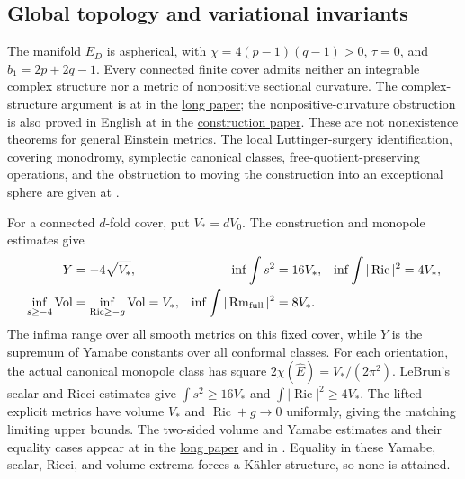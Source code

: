 \documentclass[a4paper,11pt]{article}
\numberwithin{equation}{section}
\theoremstyle{definition}
\newcommand{\Ric}{\operatorname{Ric}}
\newcommand{\Rm}{\operatorname{Rm}}
\newcommand{\Vol}{\operatorname{Vol}}
\begin{document}
\subsection{Global topology and variational invariants}\label{sec:bundle-values}
The manifold $E_D$ is aspherical, with $\chi=4(p-1)(q-1)>0$, $\tau=0$, and $b_1=2p+2q-1$.
Every connected finite cover admits neither an integrable complex structure nor a metric of nonpositive sectional curvature. The complex-structure argument is at  in the \href{20260912.tex}{long paper}; the nonpositive-curvature obstruction is also proved in English at  in the \href{20260916_construction.tex}{construction paper}.
These are not nonexistence theorems for general Einstein metrics.
The local Luttinger-surgery identification, covering monodromy, symplectic canonical classes, free-quotient-preserving operations, and the obstruction to moving the construction into an exceptional sphere are given at .

For a connected $d$-fold cover, put $V_*=dV_0$. The construction and monopole estimates give
\begin{align}
 Y&=-4\sqrt{V_*},&
 \inf\int s^2&=16V_*,&\inf\int|\Ric|^2&=4V_*,\notag\\
 \inf_{s\ge-4}\Vol&=\inf_{\Ric\ge-g}\Vol=V_*,&
 \inf\int|\Rm_{\rm full}|^2&=8V_* .\label{eq:bundlefunctionals}
\end{align}
The infima range over all smooth metrics on this fixed cover, while $Y$ is the supremum of Yamabe constants over all conformal classes.
For each orientation, the actual canonical monopole class has square $2\chi(\widehat E)=V_*/(2\pi^2)$.
LeBrun's scalar and Ricci estimates give $\int s^2\ge16V_*$ and $\int|\Ric|^2\ge4V_*$.
The lifted explicit metrics have volume $V_*$ and $\Ric+g\to0$ uniformly, giving the matching limiting upper bounds.
The two-sided volume and Yamabe estimates and their equality cases appear at  in the \href{20260912.tex}{long paper} and in \cite[Proposition 3.2 and Theorem 5.3]{LeBrun2006}.
Equality in these Yamabe, scalar, Ricci, and volume extrema forces a K\"ahler structure, so none is attained.
\end{document}

